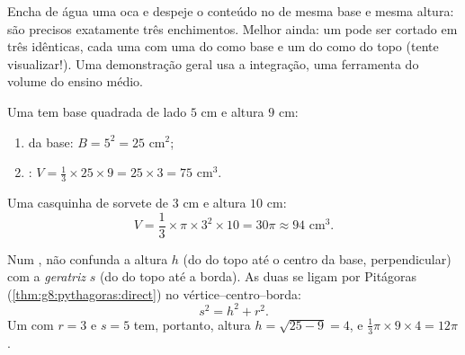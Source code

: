 \begin{remark}
Encha de água uma  oca e despeje o conteúdo no  de mesma
base e mesma altura: são precisos exatamente três enchimentos. Melhor
ainda: um  pode ser cortado em três  idênticas, cada uma
com uma  do  como base e um  do  como  do
topo (tente visualizar!). Uma demonstração geral usa a integração, uma
ferramenta do volume do ensino médio.
\end{remark}

\begin{example}\label{ex:g8:solids:volume}
Uma  tem base quadrada de lado $5$ cm e altura $9$ cm:
\begin{enumerate}
  \item {} da base: $B = 5^2 = 25$ cm$^2$;
  \item {}: $V = \frac13 \times 25 \times 9 = 25 \times 3 = 75$
        cm$^3$.
\end{enumerate}
Uma casquinha de sorvete de  $3$ cm e altura $10$ cm:
\[
V = \frac13 \times \pi \times 3^2 \times 10 = 30\pi \approx 94
\text{ cm}^3 .
\]
\end{example}

\begin{example}\label{ex:g8:solids:slant}
Num , não confunda a altura $h$ (do  do topo até o centro
da base, perpendicular) com a \emph{geratriz} $s$ (do  do topo
até a borda). As duas se ligam por Pitágoras
(\cref{thm:g8:pythagoras:direct}) no 
vértice--centro--borda:
\[
s^2 = h^2 + r^2 .
\]
Um  com $r = 3$ e $s = 5$ tem, portanto, altura
$h = \sqrt{25 - 9} = 4$, e 
$\frac13 \pi \times 9 \times 4 = 12\pi$.
\end{example}

